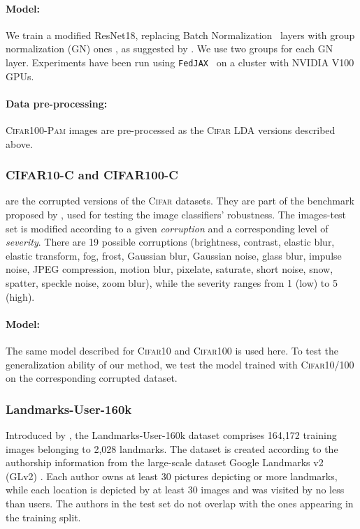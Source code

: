 \paragraph{Model:} We train a modified ResNet18, replacing Batch Normalization~\cite{ioffe2015batch} layers with group normalization (GN) ones \cite{wu2018group}, as suggested by \cite{hsieh2020non}. We use two groups for each GN layer. Experiments have been run using \texttt{FedJAX}~\cite{ro2021fedjax} on a cluster with NVIDIA V100 GPUs.

\paragraph{Data pre-processing:} \textsc{Cifar100-Pam} images are pre-processed as the \textsc{Cifar} LDA versions described above.

\subsubsection{CIFAR10-C and CIFAR100-C} are the corrupted versions of the \textsc{Cifar} datasets. They are part of the benchmark proposed by \cite{hendrycks2019benchmarking}, used for testing the image classifiers' robustness. The  images-test set is modified according to a given \textit{corruption} and a corresponding level of \textit{severity}. There are 19 possible corruptions (brightness, contrast, elastic blur, elastic transform, fog, frost, Gaussian blur, Gaussian noise, glass blur, impulse noise, JPEG compression, motion blur, pixelate, saturate, short noise, snow, spatter, speckle noise, zoom blur), while the severity ranges from 1 (low) to 5 (high). 
\paragraph{Model:} The same model described for \textsc{Cifar10} and \textsc{Cifar100} is used here. To test the generalization ability of our method, we test the model trained with \textsc{Cifar10/100} on the corresponding corrupted dataset.
 
\subsubsection{Landmarks-User-160k} Introduced by \cite{hsu2020federated}, the Landmarks-User-160k dataset comprises 164,172 training images belonging to 2,028 landmarks. The dataset is created according to the authorship information from the large-scale dataset Google Landmarks v2 (GLv2) \cite{weyand2020google}. Each author owns at least 30 pictures depicting  or more landmarks, while each location is depicted by at least 30 images and was visited by no less than  users. The authors in the test set do not overlap with the ones appearing in the training split. 
